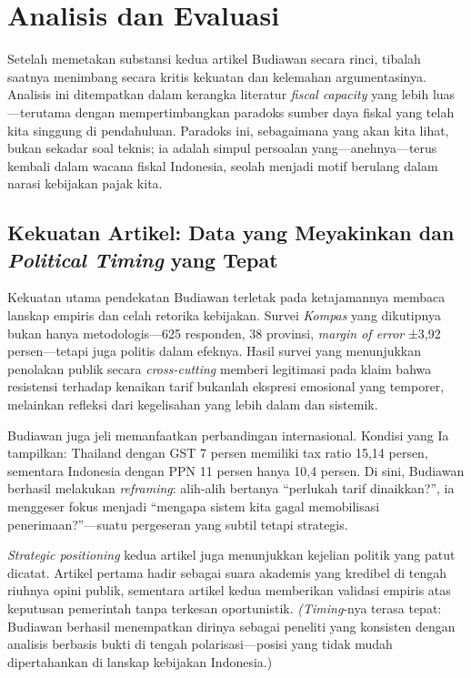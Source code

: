 \section{Analisis dan Evaluasi}
\label{sec:Analisis & Evaluasi}
\setlength{\parskip}{0pt}
\raggedbottom

Setelah memetakan substansi kedua artikel Budiawan secara rinci, tibalah saatnya menimbang secara kritis kekuatan dan kelemahan argumentasinya. Analisis ini ditempatkan dalam kerangka literatur \textit{fiscal capacity} yang lebih luas—terutama dengan mempertimbangkan paradoks sumber daya fiskal yang telah kita singgung di pendahuluan. Paradoks ini, sebagaimana yang akan kita lihat, bukan sekadar soal teknis; ia adalah simpul persoalan yang—anehnya—terus kembali dalam wacana fiskal Indonesia, seolah menjadi motif berulang dalam narasi kebijakan pajak kita.

\subsection{Kekuatan Artikel: Data yang Meyakinkan dan \textit{Political Timing} yang Tepat}

Kekuatan utama pendekatan Budiawan terletak pada ketajamannya membaca lanskap empiris dan celah retorika kebijakan. Survei \textit{Kompas} yang dikutipnya bukan hanya metodologis—625 responden, 38 provinsi, \textit{margin of error} ±3,92 persen—tetapi juga politis dalam efeknya. Hasil survei yang menunjukkan penolakan publik secara \textit{cross-cutting} memberi legitimasi pada klaim bahwa resistensi terhadap kenaikan tarif bukanlah ekspresi emosional yang temporer, melainkan refleksi dari kegelisahan yang lebih dalam dan sistemik.

Budiawan juga jeli memanfaatkan perbandingan internasional. Kondisi yang Ia tampilkan: Thailand dengan GST 7 persen memiliki tax ratio 15,14 persen, sementara Indonesia dengan PPN 11 persen hanya 10,4 persen. Di sini, Budiawan berhasil melakukan \textit{reframing}: alih-alih bertanya “perlukah tarif dinaikkan?”, ia menggeser fokus menjadi “mengapa sistem kita gagal memobilisasi penerimaan?”—suatu pergeseran yang subtil tetapi strategis.

\textit{Strategic positioning} kedua artikel juga menunjukkan kejelian politik yang patut dicatat. Artikel pertama hadir sebagai suara akademis yang kredibel di tengah riuhnya opini publik, sementara artikel kedua memberikan validasi empiris atas keputusan pemerintah tanpa terkesan oportunistik. \textit{(Timing}-nya terasa tepat: Budiawan berhasil menempatkan dirinya sebagai peneliti yang konsisten dengan analisis berbasis bukti di tengah polarisasi—posisi yang tidak mudah dipertahankan di lanskap kebijakan Indonesia.)

